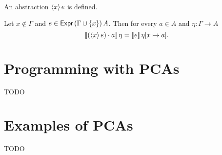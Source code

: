 \begin{proposition}
  \label{prop:abstraction-defined}
  An abstraction $\langle x \rangle\, e$ is defined.
\end{proposition}

\begin{proposition}
  \label{prop:abstraction-equal}
  Let $x \not\in \Gamma$ and $e \in \mathsf{Expr}\,(\Gamma \cup \{x\})\,A$.
  Then for every $a \in A$ and $\eta : \Gamma \to A$
  \begin{equation*}
    [\![ (\langle x \rangle\, e) \cdot a ]\!] \, \eta =
    [\![ e ]\!] \, \eta[x \mapsto a].
  \end{equation*}
\end{proposition}


\section{Programming with PCAs}

TODO

\section{Examples of PCAs}

TODO

